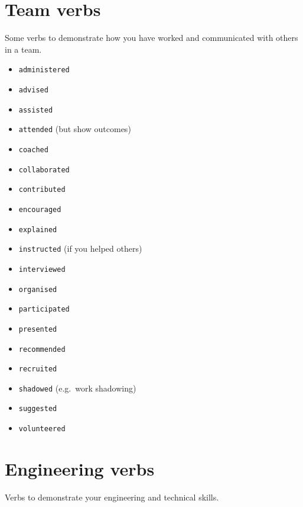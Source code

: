 \documentclass[
]{book}
\providecommand{\tightlist}{%
  \setlength{\itemsep}{0pt}\setlength{\parskip}{0pt}}
\begin{document}
\hypertarget{joining}{%
\section{Team verbs}\label{joining}}

Some verbs to demonstrate how you have worked and communicated with others in a team.

\begin{itemize}
\tightlist
\item
  \texttt{administered}
\item
  \texttt{advised}
\item
  \texttt{assisted}
\item
  \texttt{attended} (but show outcomes)
\item
  \texttt{coached}
\item
  \texttt{collaborated}
\item
  \texttt{contributed}
\item
  \texttt{encouraged}
\item
  \texttt{explained}
\item
  \texttt{instructed} (if you helped others)
\item
  \texttt{interviewed}
\item
  \texttt{organised}
\item
  \texttt{participated}
\item
  \texttt{presented}
\item
  \texttt{recommended}
\item
  \texttt{recruited}
\item
  \texttt{shadowed} (e.g.~work shadowing)
\item
  \texttt{suggested}
\item
  \texttt{volunteered}
\end{itemize}

\hypertarget{engineering}{%
\section{Engineering verbs}\label{engineering}}

Verbs to demonstrate your engineering and technical skills.
\end{document}
